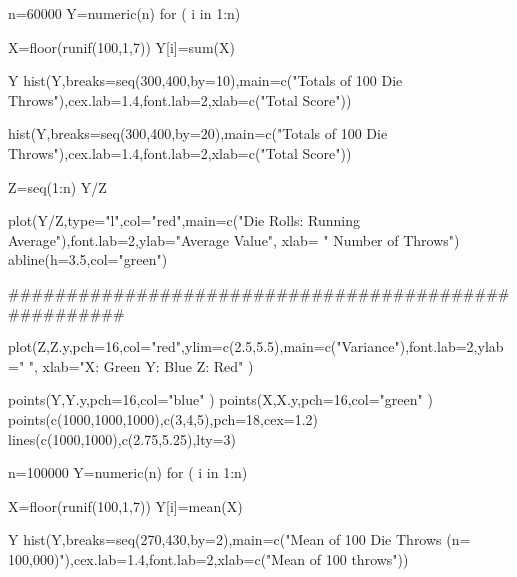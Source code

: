 \documentclass[a4]{beamer}
\begin{document}

n=60000
Y=numeric(n)
for ( i in 1:n){

X=floor(runif(100,1,7))
Y[i]=sum(X)
}

Y
hist(Y,breaks=seq(300,400,by=10),main=c("Totals of 100 Die Throws"),cex.lab=1.4,font.lab=2,xlab=c("Total Score"))

hist(Y,breaks=seq(300,400,by=20),main=c("Totals of 100 Die Throws"),cex.lab=1.4,font.lab=2,xlab=c("Total Score"))



Z=seq(1:n)
Y/Z

plot(Y/Z,type="l",col="red",main=c("Die Rolls: Running Average"),font.lab=2,ylab="Average Value", xlab=
" Number of Throws")
abline(h=3.5,col="green")


#####################################################

plot(Z,Z.y,pch=16,col="red",ylim=c(2.5,5.5),main=c("Variance"),font.lab=2,ylab=" ", xlab="X: Green  Y: Blue  Z: Red" )

points(Y,Y.y,pch=16,col="blue" )
points(X,X.y,pch=16,col="green" )
points(c(1000,1000,1000),c(3,4,5),pch=18,cex=1.2)
lines(c(1000,1000),c(2.75,5.25),lty=3)



n=100000
Y=numeric(n)
for ( i in 1:n){

X=floor(runif(100,1,7))
Y[i]=mean(X)
}

Y
hist(Y,breaks=seq(270,430,by=2),main=c("Mean of 100 Die Throws (n= 100,000)"),cex.lab=1.4,font.lab=2,xlab=c("Mean of 100 throws")) 
\end{document}
